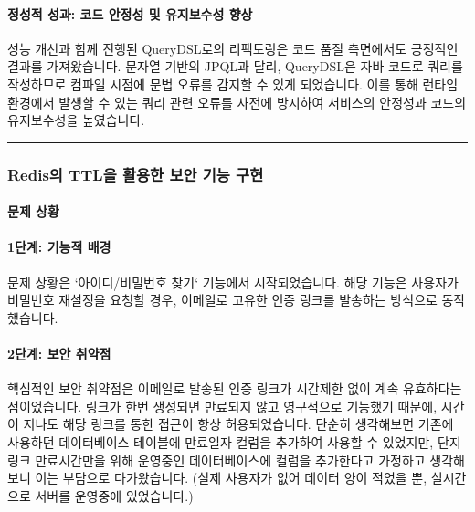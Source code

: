 \documentclass[12pt,a4paper]{article}
\newcommand{\divider}{%
    \vspace{0.5cm}%
    \begin{center}%
    \textcolor{lightgray}{\rule{0.2\textwidth}{0.5pt}}%
    \end{center}%
    \vspace{0.5cm}%
}
\begin{document}
    \vspace{1em}


    \paragraph{정성적 성과: 코드 안정성 및 유지보수성 향상} \par
    성능 개선과 함께 진행된 QueryDSL로의 리팩토링은 코드 품질 측면에서도 긍정적인 결과를 가져왔습니다. 문자열 기반의 JPQL과 달리, QueryDSL은 자바 코드로 쿼리를 작성하므로 컴파일 시점에 문법 오류를 감지할 수 있게 되었습니다. 이를 통해 런타임 환경에서 발생할 수 있는 쿼리 관련 오류를 사전에 방지하여 서비스의 안정성과 코드의 유지보수성을 높였습니다.

    \divider

    \subsubsection{Redis의 TTL을 활용한 보안 기능 구현}


    \paragraph{문제 상황}


    \paragraph{1단계: 기능적 배경} \par
    문제 상황은 `아이디/비밀번호 찾기` 기능에서 시작되었습니다. 해당 기능은 사용자가 비밀번호 재설정을 요청할 경우, 이메일로 고유한 인증 링크를 발송하는 방식으로 동작했습니다.\\

    \vspace{1em}


    \paragraph{2단계: 보안 취약점} \par
    핵심적인 보안 취약점은 이메일로 발송된 인증 링크가 시간제한 없이 계속 유효하다는 점이었습니다. 링크가 한번 생성되면 만료되지 않고 영구적으로 기능했기 때문에, 시간이 지나도 해당 링크를 통한 접근이 항상 허용되었습니다. 단순히 생각해보면 기존에 사용하던 데이터베이스 테이블에 만료일자 컬럼을 추가하여 사용할 수 있었지만, 단지 링크 만료시간만을 위해 운영중인 데이터베이스에 컬럼을 추가한다고 가정하고 생각해보니 이는 부담으로 다가왔습니다. (실제 사용자가 없어 데이터 양이 적었을 뿐, 실시간으로 서버를 운영중에 있었습니다.)\\
\end{document}
